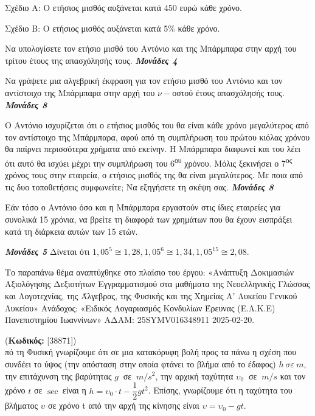 \documentclass[11pt,a4paper,twoside]{book}
\newcounter{askhsh}[chapter]
\renewcommand{\theaskhsh}{
	\bf{\titlefont{\Large{\thechapter}}.\arabic{askhsh}}
}
\newcommand{\Askhsh}[2]{\refstepcounter{askhsh}{\titlefont{Άσκηση\theaskhsh} - \textcolor{maincolor}{ΘΕΜΑ #2}} (\small{\textbf{Κωδικός:} #1})\\}{}
\newcommand{\monades}[1]{
\hspace*{\fill}
\textbf{\textit{\textcolor{maincolor}{Μονάδες #1}}}}
\begin{document}
Σχέδιο Α: Ο ετήσιος μισθός αυξάνεται κατά 450 ευρώ κάθε χρόνο.

Σχέδιο Β: Ο ετήσιος μισθός αυξάνεται κατά 5\% κάθε χρόνο.

\begin{alist}
\item Να υπολογίσετε τον ετήσιο μισθό του Αντόνιο και της Μπάρμπαρα στην αρχή του τρίτου έτους της απασχόλησής τους.\monades{4}
\item Να γράψετε μια αλγεβρική έκφραση για τον ετήσιο μισθό του Αντόνιο και τον αντίστοιχο της Μπάρμπαρα στην αρχή του $\nu -$οστού έτους απασχόλησής τους.\monades{8}
\item Ο Αντόνιο ισχυρίζεται ότι ο ετήσιος μισθός του θα είναι κάθε χρόνο μεγαλύτερος από τον αντίστοιχο της Μπάρμπαρα, αφού από τη συμπλήρωση του πρώτου κιόλας χρόνου θα παίρνει περισσότερα χρήματα από εκείνην. Η Μπάρμπαρα διαφωνεί και του λέει ότι αυτό θα ισχύει μέχρι την συμπλήρωση του 6\textsuperscript{ου} χρόνου. Μόλις ξεκινήσει ο 7\textsuperscript{ος} χρόνος τους στην εταιρεία, ο ετήσιος μισθός της θα είναι μεγαλύτερος. Με ποια από τις δυο τοποθετήσεις συμφωνείτε; Να εξηγήσετε τη σκέψη σας.\monades{8}
\item Εάν τόσο ο Αντόνιο όσο και η Μπάρμπαρα εργαστούν στις ίδιες εταιρείες για συνολικά 15 χρόνια, να βρείτε τη διαφορά των χρημάτων που θα έχουν εισπράξει κατά τη διάρκεια αυτών των 15 ετών.
\monades{5}
Δίνεται ότι ${1,05}^{5} \cong 1,28, {1,05}^{6} \cong 1,34, {1,05}^{15} \cong 2,08$.

{\footnotesize Το παραπάνω θέμα αναπτύχθηκε στο πλαίσιο του έργου: «Ανάπτυξη Δοκιμασιών Αξιολόγησης Δεξιοτήτων Εγγραμματισμού στα μαθήματα της Νεοελληνικής Γλώσσας και Λογοτεχνίας, της Άλγεβρας, της Φυσικής και της Χημείας Α' Λυκείου Γενικού Λυκείου» Ανάδοχος: «Ειδικός Λογαριασμός Κονδυλίων Έρευνας (Ε.Λ.Κ.Ε) Πανεπιστημίου Ιωαννίνων» ΑΔΑΜ: 25SYMV016348911 2025-02-20.}
\end{alist}

\vspace{4mm}

\Askhsh{[38871]}
Από τη Φυσική γνωρίζουμε ότι σε μια κατακόρυφη βολή προς τα πάνω η σχέση που συνδέει το ύψος (την απόσταση στην οποία φτάνει το βλήμα από το έδαφος) $h\ \sigma\varepsilon\ m$, την επιτάχυνση της βαρύτητας $g\ $ σε $\ m/s^{2}$, την αρχική ταχύτητα $\upsilon_{0}\ $ σε $\ m/s$ και τον χρόνο $t$ σε $\sec\ $είναι η $h = \upsilon_{0} \cdot t - \dfrac{1}{2}gt^{2}$. Επίσης, γνωρίζουμε ότι η ταχύτητα του βλήματος $\upsilon$ σε χρόνο t από την αρχή της κίνησης είναι ${\upsilon = \upsilon}_{0} - gt$.
\end{document}
